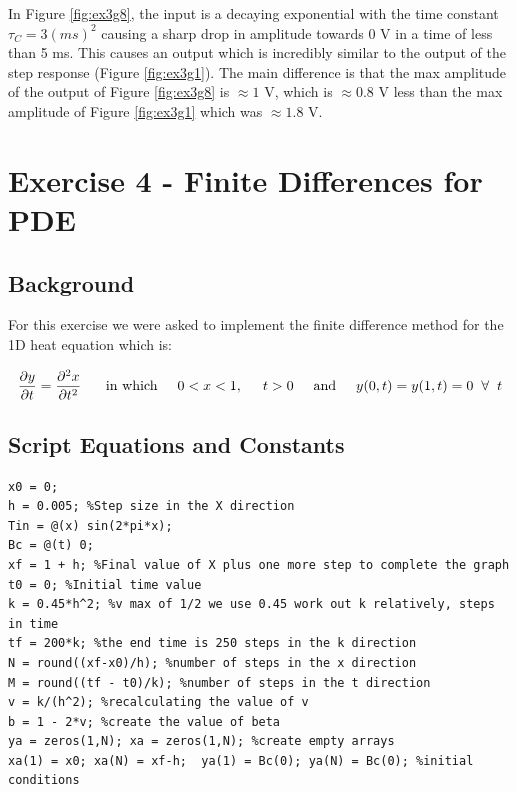 \documentclass[11pt,a4paper]{article}
\begin{document}
In Figure \ref{fig:ex3g8}, the input is a decaying exponential with the time constant $\tau_C = 3 (ms)^2$ causing a sharp drop in amplitude towards 0 V in a time of less than 5 ms. This causes an output which is incredibly similar to the output of the step response (Figure \ref{fig:ex3g1}). The main difference is that the max amplitude of the output of Figure \ref{fig:ex3g8} is $\approx 1$ V, which is $\approx 0.8$ V less than the max amplitude of Figure \ref{fig:ex3g1} which was $\approx 1.8$ V.

\pagebreak

\section{Exercise 4 - Finite Differences for PDE}\vspace{-1mm}
\subsection{Background}

For this exercise we were asked to implement the finite difference method for the 1D heat equation which is:

\[\frac{\partial y}{\partial t} = \frac{\partial^2 x}{\partial t^2}\ \hspace{5mm} \text{in which} \hspace{5mm} 0 < x < 1, \hspace{5mm} t > 0 \hspace{5mm} \text{and} \hspace{5mm} y(0,t) = y(1,t) = 0 \hspace{2mm} \forall \hspace{2mm} t\]

\subsection{Script Equations and Constants}

\begin{verbatim}
x0 = 0;
h = 0.005; %Step size in the X direction
Tin = @(x) sin(2*pi*x);
Bc = @(t) 0;
xf = 1 + h; %Final value of X plus one more step to complete the graph
t0 = 0; %Initial time value
k = 0.45*h^2; %v max of 1/2 we use 0.45 work out k relatively, steps in time
tf = 200*k; %the end time is 250 steps in the k direction
N = round((xf-x0)/h); %number of steps in the x direction
M = round((tf - t0)/k); %number of steps in the t direction
v = k/(h^2); %recalculating the value of v
b = 1 - 2*v; %create the value of beta
ya = zeros(1,N); xa = zeros(1,N); %create empty arrays
xa(1) = x0; xa(N) = xf-h;  ya(1) = Bc(0); ya(N) = Bc(0); %initial conditions
\end{verbatim}
\end{document}
